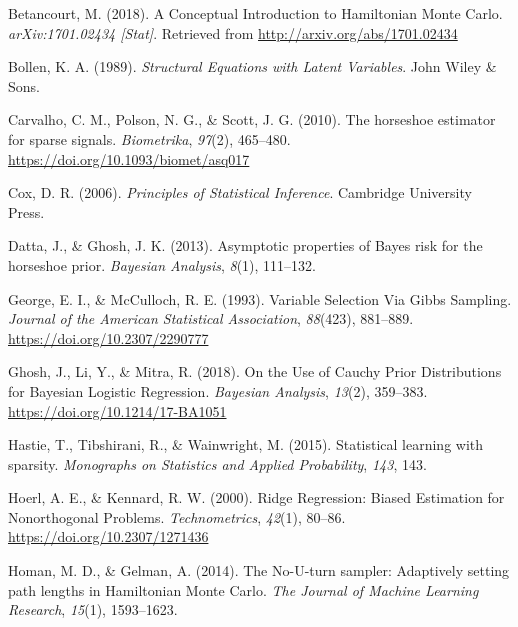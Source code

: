 \documentclass[
  man, donotrepeattitle,floatsintext]{apa6}
\newlength{\cslhangindent}
\newlength{\cslentryspacingunit} %
\newenvironment{CSLReferences}[2] %
 {%
  \setlength{\parindent}{0pt}
  \ifodd #1
  \let\oldpar\par
  \def\par{\hangindent=\cslhangindent\oldpar}
  \fi
  \setlength{\parskip}{#2\cslentryspacingunit}
 }%
 {}
\begin{document}
\hypertarget{refs}{}
\begin{CSLReferences}{1}{0}
\leavevmode{}%
Betancourt, M. (2018). A {Conceptual} {Introduction} to {Hamiltonian} {Monte} {Carlo}. \emph{arXiv:1701.02434 {[}Stat{]}}. Retrieved from \url{http://arxiv.org/abs/1701.02434}

\leavevmode{}%
Bollen, K. A. (1989). \emph{Structural {Equations} with {Latent} {Variables}}. John Wiley \& Sons.

\leavevmode{}%
Carvalho, C. M., Polson, N. G., \& Scott, J. G. (2010). The horseshoe estimator for sparse signals. \emph{Biometrika}, \emph{97}(2), 465--480. \url{https://doi.org/10.1093/biomet/asq017}

\leavevmode{}%
Cox, D. R. (2006). \emph{Principles of {Statistical} {Inference}}. Cambridge University Press.

\leavevmode{}%
Datta, J., \& Ghosh, J. K. (2013). Asymptotic properties of {Bayes} risk for the horseshoe prior. \emph{Bayesian Analysis}, \emph{8}(1), 111--132.

\leavevmode{}%
George, E. I., \& McCulloch, R. E. (1993). Variable {Selection} {Via} {Gibbs} {Sampling}. \emph{Journal of the American Statistical Association}, \emph{88}(423), 881--889. \url{https://doi.org/10.2307/2290777}

\leavevmode{}%
Ghosh, J., Li, Y., \& Mitra, R. (2018). On the {Use} of {Cauchy} {Prior} {Distributions} for {Bayesian} {Logistic} {Regression}. \emph{Bayesian Analysis}, \emph{13}(2), 359--383. \url{https://doi.org/10.1214/17-BA1051}

\leavevmode{}%
Hastie, T., Tibshirani, R., \& Wainwright, M. (2015). Statistical learning with sparsity. \emph{Monographs on Statistics and Applied Probability}, \emph{143}, 143.

\leavevmode{}%
Hoerl, A. E., \& Kennard, R. W. (2000). Ridge {Regression}: {Biased} {Estimation} for {Nonorthogonal} {Problems}. \emph{Technometrics}, \emph{42}(1), 80--86. \url{https://doi.org/10.2307/1271436}

\leavevmode{}%
Homan, M. D., \& Gelman, A. (2014). The {No}-{U}-turn sampler: Adaptively setting path lengths in {Hamiltonian} {Monte} {Carlo}. \emph{The Journal of Machine Learning Research}, \emph{15}(1), 1593--1623.


\end{CSLReferences}
\end{document}
